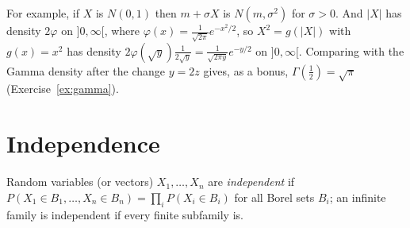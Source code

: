 For example, if $X$ is $N(0,1)$ then $m+\sigma X$ is $N(m,\sigma^2)$ for $\sigma>0$. And $|X|$ has density $2\varphi$ on $]0,\infty[$, where
$\varphi(x)=\frac1{\sqrt{2\pi}}e^{-x^2/2}$, so $X^2=g(|X|)$ with $g(x)=x^2$ has density $2\varphi(\sqrt y)\frac1{2\sqrt y}=\frac1{\sqrt{2\pi y}}e^{-y/2}$ on $]0,\infty[$. Comparing
with the Gamma density after the change $y=2z$ gives, as a bonus, $\Gamma(\frac12)=\sqrt\pi$ (Exercise~\ref{ex:gamma}).

\section{Independence}\label{sec:independence}

\begin{definition}
Random variables (or vectors) $X_1,\dots,X_n$ are \emph{independent} if $P(X_1\in B_1,\dots,X_n\in B_n)=\prod_iP(X_i\in B_i)$ for all Borel sets
$B_i$; an infinite family is independent if every finite subfamily is.
\end{definition}

